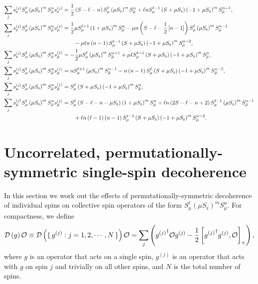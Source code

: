 \documentclass[aps,pra,twocolumn,longbibliography]{revtex4-2}
\newcommand{\f}[2]{\dfrac{#1}{#2}} %
\newcommand{\p}[1]{\left( #1 \right)} %
\renewcommand{\sp}[1]{\left[ #1 \right]} %
\newcommand{\D}{\mathcal{D}}
\renewcommand{\O}{\mathcal{O}}
\newcommand{\z}{\text{z}}
\newcommand{\bmu}{{\bar\mu}}
\newcommand{\1}{\mathds{1}}
\begin{document}
\begin{align}
  \sum_j s_\z^{(j)} S_\mu^\ell \p{\mu S_\z}^m S_\bmu^n s_\z^{(j)}
  &= \f12 \p{S-\ell-n} S_\mu^\ell \p{\mu S_\z}^m S_\bmu^n
  + \ell n S_\mu^{\ell-1} \p{S+\mu S_\z}
  \p{-1+\mu S_\z}^m S_\bmu^{n-1},
  \label{eq:san_z_z} \allowdisplaybreaks \\
  \sum_j s_\z^{(j)} S_\mu^\ell \p{\mu S_\z}^m S_\bmu^n s_\mu^{(j)}
  &= \f12 \mu S_\mu^{\ell+1} \p{1+\mu S_\z}^m S_\bmu^n
  - \mu n \p{S-\ell-\f12\sp{n-1}} S_\mu^\ell
  \p{\mu S_\z}^m S_\bmu^{n-1} \notag \\
  &\qquad - \mu\ell n\p{n-1} S_\mu^{\ell-1}
  \p{S+\mu S_\z} \p{-1+\mu S_\z}^m S_\bmu^{n-2},
  \label{eq:san_z_mu} \allowdisplaybreaks \\
  \sum_j s_\z^{(j)} S_\mu^\ell \p{\mu S_\z}^m S_\bmu^n s_\bmu^{(j)}
  &= -\f12 \mu S_\mu^\ell \p{\mu S_\z}^m S_\bmu^{n+1}
  + \mu \ell S_\mu^{\ell-1} \p{S+\mu S_\z} \p{-1+\mu S_\z}^m S_\bmu^n,
  \label{eq:san_z_bmu} \allowdisplaybreaks \\
  \sum_j s_\mu^{(j)} S_\mu^\ell \p{\mu S_\z}^m S_\bmu^n s_\mu^{(j)}
  &= n S_\mu^{\ell+1} \p{\mu S_\z}^m S_\bmu^{n-1}
  - n\p{n-1} S_\mu^\ell \p{S+\mu S_\z} \p{-1+\mu S_\z}^m S_\bmu^{n-2},
  \label{eq:san_mu_mu} \allowdisplaybreaks \\
  \sum_j s_\mu^{(j)} S_\mu^\ell \p{\mu S_\z}^m S_\bmu^n s_\bmu^{(j)}
  &= S_\mu^\ell \p{S+\mu S_\z}\p{-1+\mu S_\z}^m S_\bmu^n,
  \label{eq:san_mu_bmu} \allowdisplaybreaks \\
  \sum_j s_\bmu^{(j)} S_\mu^\ell \p{\mu S_\z}^m S_\bmu^n s_\mu^{(j)}
  &= S_\mu^\ell \p{S - \ell - n - \mu S_\z}
  \p{1+\mu S_\z}^m S_\bmu^n
  + \ell n \p{2S - \ell - n + 2}
  S_\mu^{\ell-1} \p{\mu S_\z}^m S_\bmu^{n-1} \notag \\
  &\qquad + \ell n \p{\ell-1} \p{n-1} S_\mu^{\ell-2} \p{S+\mu S_\z}
  \p{-1+\mu S_\z}^m S_\bmu^{n-2}.
  \label{eq:san_bmu_mu}
\end{align}

\section{Uncorrelated, permutationally-symmetric single-spin
  decoherence}
\label{sec:decoherence_single}

In this section we work out the effects of permutationally-symmetric
decoherence of individual spins on collective spin operators of the
form $S_\mu^\ell \p{\mu S_\z}^m S_\bmu^n$.  For compactness, we define
\begin{align}
  \D\p{g} \O
  \equiv \D\p{\set{g^{(j)}:j=1,2,\cdots,N}} \O
  = \sum_j\p{{g^{(j)}}^\dag \O g^{(j)}
    - \f12\sp{{g^{(j)}}^\dag g^{(j)}, \O}_+},
\end{align}
where $g$ is an operator that acts on a single spin, $g^{(j)}$ is an
operator that acts with $g$ on spin $j$ and trivially on all other
spins, and $N$ is the total number of spins.
\end{document}
